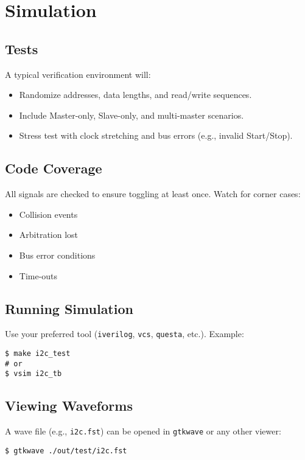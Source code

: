 \section{Simulation}

\subsection{Tests}
A typical verification environment will:
\begin{itemize}
  \item Randomize addresses, data lengths, and read/write sequences.
  \item Include Master-only, Slave-only, and multi-master scenarios.
  \item Stress test with clock stretching and bus errors (e.g., invalid Start/Stop).
\end{itemize}

\subsection{Code Coverage}
All signals are checked to ensure toggling at least once. Watch for corner cases:
\begin{itemize}
  \item Collision events
  \item Arbitration lost
  \item Bus error conditions
  \item Time-outs
\end{itemize}

\subsection{Running Simulation}
Use your preferred tool (\texttt{iverilog}, \texttt{vcs}, \texttt{questa}, etc.). Example:
\begin{verbatim}
$ make i2c_test
# or
$ vsim i2c_tb
\end{verbatim}

\subsection{Viewing Waveforms}
A wave file (e.g., \texttt{i2c.fst}) can be opened in \texttt{gtkwave} or any other viewer:
\begin{verbatim}
$ gtkwave ./out/test/i2c.fst
\end{verbatim}
